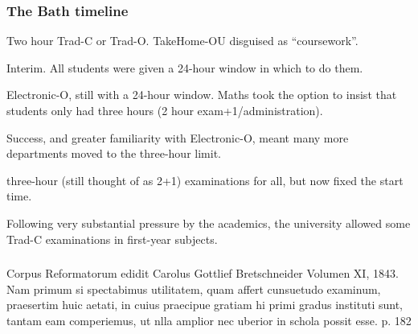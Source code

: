 \begin{frame}[fragile]
\frametitle{The Bath timeline}
\pause
\begin{description}[<+->]
\item[Prior]Two hour Trad-C or Trad-O. TakeHome-OU disguised as ``coursework''.
\item[May 2020] Interim. %
All students were given a 24-hour window in which to do them. 
\item[January 2021]Electronic-O,
still with a 24-hour window.  Maths took the option to insist that students only had three hours (2 hour exam+1/administration).
\item[May 2021] 
Success, and greater familiarity with Electronic-O, meant
many more departments moved to the three-hour limit.
\item[January 2022] 
three-hour (still thought of as 2+1) examinations for all, but now fixed the start time.
\item[May 2022] Following very substantial pressure by the academics, the university allowed some Trad-C examinations in first-year subjects.

\end{description}
\end{frame}
\begin{frame}[fragile]
\frametitle{}
\pause
\end{frame}
\iffalse
Corpus Reformatorum edidit Carolus Gottlief Bretschneider Volumen XI, 1843.
Nam primum si spectabimus utilitatem, quam affert cunsuetudo examinum, praesertim huic aetati, in cuius praecipue gratiam hi primi gradus instituti sunt, tantam eam comperiemus, ut nlla amplior nec uberior in schola possit esse. p. 182

